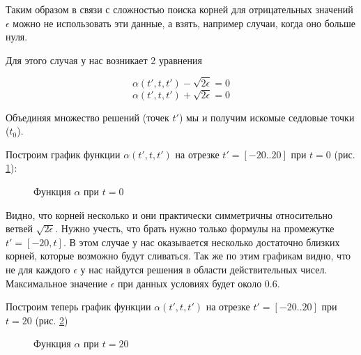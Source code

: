 \documentclass[14pt]{extarticle}
\begin{document}
Таким образом в связи с сложностью поиска корней для отрицательных значений $\epsilon$ можно не использовать эти данные, а взять, например случаи, когда  оно больше нуля.

Для этого случая у нас возникает 2 уравнения

$$\alpha(t', t, t') - \sqrt{2\epsilon} = 0$$
$$\alpha(t', t, t') + \sqrt{2\epsilon} = 0$$

Объединяя множество решений (точек $t'$) мы и получим искомые седловые точки ($t_0$).

Построим график функции $\alpha(t', t, t')$ на отрезке $t' = [-20..20]$ при $t = 0$ (рис. \ref{ris:alpha-20..0}):

\begin{figure}[h]
	\caption{Функция $\alpha$ при $t = 0$}
	\label{ris:alpha-20..0}
\end{figure}

Видно, что корней несколько и они практически симметричны относительно ветвей $\sqrt{2 \epsilon}$. Нужно учесть, что брать нужно только формулы на промежутке $t' = [-20, t]$. 
В этом случае у нас оказывается несколько достаточно близких корней, которые возможно будут сливаться.
Так же по этим графикам видно, что не для каждого $\epsilon$ у нас найдутся решения в области действительных чисел. Максимальное значение $\epsilon$ при данных условиях будет около 0.6. 

Построим теперь график функции $\alpha(t', t, t')$ на отрезке $t' = [-20..20]$ при $t = 20$ (рис. \ref{ris:alpha-20..20})

\begin{figure}[h]
	\caption{Функция $\alpha$ при $t = 20$}
	\label{ris:alpha-20..20}
\end{figure}
\end{document}
